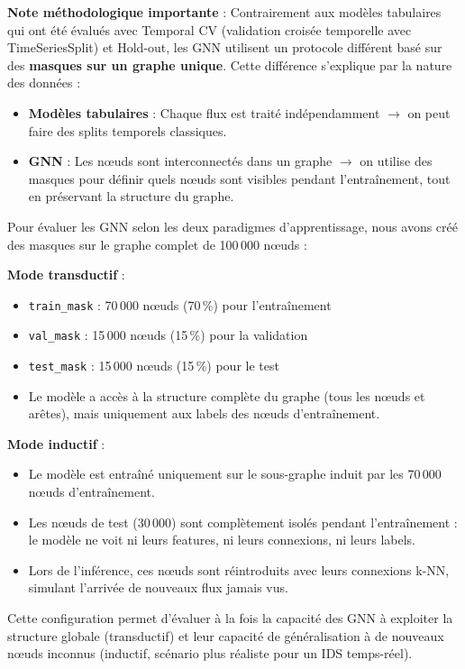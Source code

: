 ﻿\documentclass[11pt,a4paper]{article}
\begin{document}
\textbf{Note méthodologique importante} : Contrairement aux modèles tabulaires qui ont été évalués avec Temporal CV (validation croisée temporelle avec TimeSeriesSplit) et Hold-out, les GNN utilisent un protocole différent basé sur des \textbf{masques sur un graphe unique}. Cette différence s'explique par la nature des données :
\begin{itemize}
    \item \textbf{Modèles tabulaires} : Chaque flux est traité indépendamment $\rightarrow$ on peut faire des splits temporels classiques.
    \item \textbf{GNN} : Les nœuds sont interconnectés dans un graphe $\rightarrow$ on utilise des masques pour définir quels nœuds sont visibles pendant l'entraînement, tout en préservant la structure du graphe.
\end{itemize}

Pour évaluer les GNN selon les deux paradigmes d'apprentissage, nous avons créé des masques sur le graphe complet de 100\,000 nœuds :

\textbf{Mode transductif} :
\begin{itemize}
    \item \texttt{train\_mask} : 70\,000 nœuds (70\,\%) pour l'entraînement
    \item \texttt{val\_mask} : 15\,000 nœuds (15\,\%) pour la validation
    \item \texttt{test\_mask} : 15\,000 nœuds (15\,\%) pour le test
    \item Le modèle a accès à la structure complète du graphe (tous les nœuds et arêtes), mais uniquement aux labels des nœuds d'entraînement.
\end{itemize}

\textbf{Mode inductif} :
\begin{itemize}
    \item Le modèle est entraîné uniquement sur le sous-graphe induit par les 70\,000 nœuds d'entraînement.
    \item Les nœuds de test (30\,000) sont complètement isolés pendant l'entraînement : le modèle ne voit ni leurs features, ni leurs connexions, ni leurs labels.
    \item Lors de l'inférence, ces nœuds sont réintroduits avec leurs connexions k-NN, simulant l'arrivée de nouveaux flux jamais vus.
\end{itemize}

Cette configuration permet d'évaluer à la fois la capacité des GNN à exploiter la structure globale (transductif) et leur capacité de généralisation à de nouveaux nœuds inconnus (inductif, scénario plus réaliste pour un IDS temps-réel).
\end{document}
